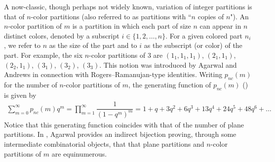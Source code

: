 \documentclass[reqno,12pt]{amsart}
\theoremstyle{definition}
\begin{document}
A now-classic, though perhaps not widely known, variation of integer partitions is that of $n$-color partitions (also referred to as partitions with ``$n$ copies of $n$").
An $n$-color partition of $m$ is a partition in which each part of size $n$ can appear in $n$ distinct colors, denoted by a subscript $i \in \{1, 2, \dots, n\}$. For a given colored part $n_i$, we refer to $n$ as the size of the part and to $i$ as the subscript (or color) of the part. For example, the six $n$-color partitions of $3$ are $(1_1,1_1,1_1)$, $(2_1,1_1)$, $(2_2,1_1)$, $(3_1)$, $(3_2)$, $(3_3)$.
This notion was introduced by Agarwal and Andrews \cite{Agarwal-Andrews87} in connection with Rogers--Ramanujan-type identities. Writing $p_{nc}(m)$ for the number of $n$-color partitions of $m$, the generating  function of $p_{nc}(m)$ (\cite[A000219]{OEIS}) is given by
\begin{align*}
\sum_{m=0}^{\infty} p_{nc}(m)q^m = \prod_{m=1}^{\infty} \dfrac{1}{(1-q^m)^m}
=1+q+3q^2+6q^3+13q^4+24q^5+ 48q^6+\dots
\end{align*}
Notice that this generating function coincides with that of the number of plane partitions. In \cite{Agarwal02}, Agarwal provides an indirect bijection proving,  through some intermediate combinatorial objects, that  that plane partitions and $n$-color partitions of $m$ are equinumerous. 
\end{document}
